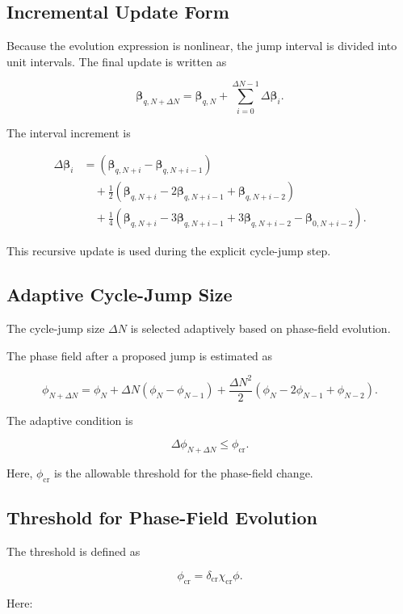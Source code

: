 ﻿\documentclass[11pt,a4paper]{article}
\begin{document}
\subsection{Incremental Update Form}

Because the evolution expression is nonlinear, the jump interval is divided into unit intervals. The final update is written as

\[
\bm{\beta}_{q,N+\Delta N}
=
\bm{\beta}_{q,N}
+
\sum_{i=0}^{\Delta N-1}
\Delta \bm{\beta}_i.
\]

The interval increment is

\[
\begin{aligned}
\Delta \bm{\beta}_i
&=
(\bm{\beta}_{q,N+i}-\bm{\beta}_{q,N+i-1}) \\
&\quad
+
\frac{1}{2}
(\bm{\beta}_{q,N+i}-2\bm{\beta}_{q,N+i-1}+\bm{\beta}_{q,N+i-2}) \\
&\quad
+
\frac{1}{4}
(\bm{\beta}_{q,N+i}-3\bm{\beta}_{q,N+i-1}+3\bm{\beta}_{q,N+i-2}-\bm{\beta}_{0,N+i-2}).
\end{aligned}
\]

This recursive update is used during the explicit cycle-jump step.

\subsection{Adaptive Cycle-Jump Size}

The cycle-jump size $\Delta N$ is selected adaptively based on phase-field evolution.

The phase field after a proposed jump is estimated as

\[
\phi_{N+\Delta N}
=
\phi_N
+
\Delta N(\phi_N-\phi_{N-1})
+
\frac{\Delta N^2}{2}
(\phi_N-2\phi_{N-1}+\phi_{N-2}).
\]

The adaptive condition is

\[
\Delta \phi_{N+\Delta N}
\leq
\phi_{\mathrm{cr}}.
\]

Here, $\phi_{\mathrm{cr}}$ is the allowable threshold for the phase-field change.

\subsection{Threshold for Phase-Field Evolution}

The threshold is defined as

\[
\phi_{\mathrm{cr}}
=
\delta_{\mathrm{cr}}\chi_{\mathrm{cr}}\phi.
\]

Here:
\end{document}
